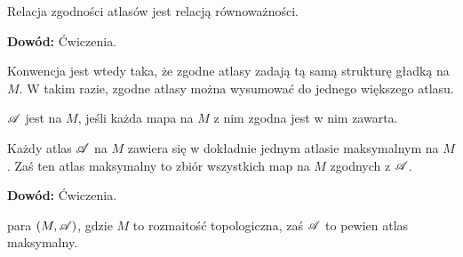 \begin{tw}
    Relacja zgodności atlasów jest relacją równoważności.
\end{tw}

\textbf{Dowód:} Ćwiczenia.

Konwencja jest wtedy taka, że zgodne atlasy zadają tą samą strukturę gładką na $M$. W takim razie, zgodne atlasy można wysumować do jednego większego atlasu.

\begin{definicja}
$\mathcal{A}$ jest  na $M$, jeśli każda mapa na $M$ z nim zgodna jest w nim zawarta. 
\end{definicja}

\begin{fakt}
    Każdy atlas $\mathcal{A}$ na $M$ zawiera się w dokładnie jednym atlasie maksymalnym na $M$. Zaś ten atlas maksymalny to zbiór wszystkich map na $M$ zgodnych z $\mathcal{A}$.
\end{fakt}

\textbf{Dowód:} Ćwiczenia.

 para $(M, \mathcal{A})$, gdzie $M$ to rozmaitość topologiczna, zaś $\mathcal{A}$ to pewien atlas maksymalny.
